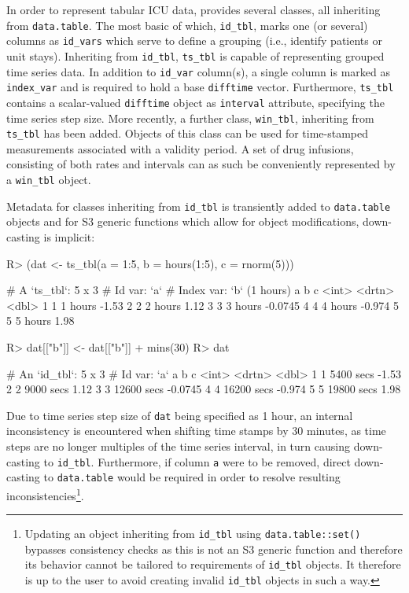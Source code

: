 \documentclass[
  notitle,
  nojss,
  noheadings]{jss}
\begin{document}
In order to represent tabular ICU data,  provides several
classes, all inheriting from \texttt{data.table}. The most basic of
which, \texttt{id\_tbl}, marks one (or several) columns as
\texttt{id\_vars} which serve to define a grouping (i.e., identify
patients or unit stays). Inheriting from \texttt{id\_tbl},
\texttt{ts\_tbl} is capable of representing grouped time series data. In
addition to \texttt{id\_var} column(s), a single column is marked as
\texttt{index\_var} and is required to hold a base 
\texttt{difftime} vector. Furthermore, \texttt{ts\_tbl} contains a
scalar-valued \texttt{difftime} object as \texttt{interval} attribute,
specifying the time series step size. More recently, a further class,
\texttt{win\_tbl}, inheriting from \texttt{ts\_tbl} has been added.
Objects of this class can be used for time-stamped measurements
associated with a validity period. A set of drug infusions, consisting
of both rates and intervals can as such be conveniently represented by a
\texttt{win\_tbl} object.

Metadata for classes inheriting from \texttt{id\_tbl} is transiently
added to \texttt{data.table} objects and for S3 generic functions which
allow for object modifications, down-casting is implicit:

\begin{CodeChunk}
\begin{CodeInput}
R> (dat <- ts_tbl(a = 1:5, b = hours(1:5), c = rnorm(5)))
\end{CodeInput}
\begin{CodeOutput}
# A `ts_tbl`: 5 x 3
# Id var:     `a`
# Index var:  `b` (1 hours)
      a b             c
  <int> <drtn>    <dbl>
1     1 1 hours -1.53
2     2 2 hours  1.12
3     3 3 hours -0.0745
4     4 4 hours -0.974
5     5 5 hours  1.98
\end{CodeOutput}
\begin{CodeInput}
R> dat[["b"]] <- dat[["b"]] + mins(30)
R> dat
\end{CodeInput}
\begin{CodeOutput}
# An `id_tbl`: 5 x 3
# Id var:      `a`
      a b                c
  <int> <drtn>       <dbl>
1     1  5400 secs -1.53
2     2  9000 secs  1.12
3     3 12600 secs -0.0745
4     4 16200 secs -0.974
5     5 19800 secs  1.98
\end{CodeOutput}
\end{CodeChunk}

Due to time series step size of \texttt{dat} being specified as 1 hour,
an internal inconsistency is encountered when shifting time stamps by 30
minutes, as time steps are no longer multiples of the time series
interval, in turn causing down-casting to \texttt{id\_tbl}. Furthermore,
if column \texttt{a} were to be removed, direct down-casting to
\texttt{data.table} would be required in order to resolve resulting
inconsistencies\footnote{Updating an object inheriting from
  \texttt{id\_tbl} using \texttt{data.table::set()} bypasses consistency
  checks as this is not an S3 generic function and therefore its
  behavior cannot be tailored to requirements of \texttt{id\_tbl}
  objects. It therefore is up to the user to avoid creating invalid
  \texttt{id\_tbl} objects in such a way.}.
\end{document}
